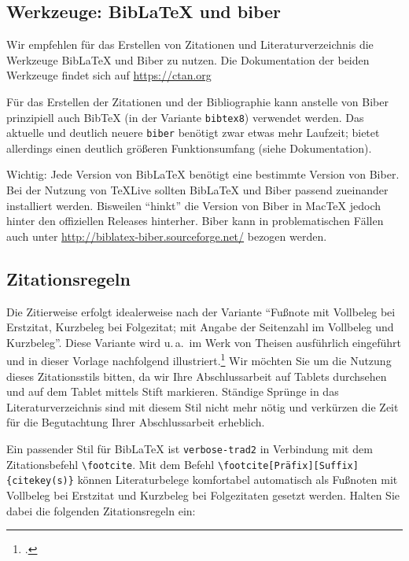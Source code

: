 \subsection{Werkzeuge: BibLaTeX und biber}

Wir empfehlen für das Erstellen von Zitationen und Literaturverzeichnis die Werkzeuge BibLaTeX und Biber zu nutzen.  Die Dokumentation der beiden Werkzeuge findet sich auf \url{https://ctan.org}

Für das Erstellen der Zitationen und der Bibliographie kann anstelle von Biber prinzipiell auch BibTeX (in der Variante \verb|bibtex8|) verwendet werden. Das aktuelle und deutlich neuere \verb|biber| benötigt zwar etwas mehr Laufzeit; bietet allerdings einen deutlich größeren Funktionsumfang (siehe Dokumentation). 

\begin{shaded}
	Wichtig: Jede Version von BibLaTeX benötigt eine bestimmte Version von Biber. Bei der Nutzung von TeXLive sollten BibLaTeX und Biber passend zueinander installiert werden. Bisweilen \enquote{hinkt} die Version von Biber in MacTeX jedoch hinter den offiziellen Releases hinterher.  Biber kann in problematischen Fällen auch unter \url{http://biblatex-biber.sourceforge.net/} bezogen werden.
\end{shaded}







\subsection{Zitationsregeln}

Die Zitierweise erfolgt idealerweise nach der Variante \enquote{Fußnote mit Vollbeleg bei Erstzitat, Kurzbeleg bei Folgezitat; mit Angabe der Seitenzahl im Vollbeleg und Kurzbeleg}. Diese Variante wird u.\,a.\ im Werk von Theisen ausführlich eingeführt und in dieser Vorlage nachfolgend illustriert.\footcite[Vgl.][Kap.~7.3]{Theisen2008}
Wir möchten Sie um die Nutzung dieses Zitationsstils bitten, da wir Ihre Abschlussarbeit auf Tablets durchsehen und auf dem Tablet mittels Stift markieren.
Ständige Sprünge in das Literaturverzeichnis sind mit diesem Stil nicht mehr nötig und verkürzen die Zeit für die Begutachtung Ihrer Abschlussarbeit erheblich.

Ein passender Stil für BibLaTeX ist \verb|verbose-trad2| in Verbindung mit dem Zitationsbefehl \verb|\footcite|.
%
Mit dem Befehl \verb|\footcite[Präfix][Suffix]{citekey(s)}| können Literaturbelege komfortabel automatisch als Fußnoten mit Vollbeleg bei Erstzitat und Kurzbeleg bei Folgezitaten gesetzt werden. Halten Sie dabei  die folgenden Zitationsregeln ein:



